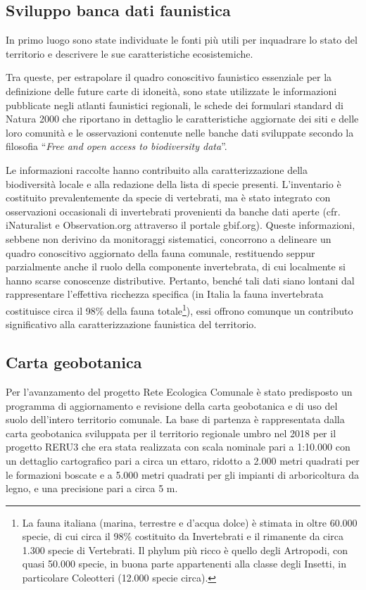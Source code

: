 \documentclass[
  a4paper,
]{book}
\begin{document}
\subsection{Sviluppo banca dati faunistica}\label{sviluppo-banca-dati-faunistica}

In primo luogo sono state individuate le fonti più utili per inquadrare lo stato del territorio e descrivere le sue caratteristiche ecosistemiche.

Tra queste, per estrapolare il quadro conoscitivo faunistico essenziale per la definizione delle future carte di idoneità, sono state utilizzate le informazioni pubblicate negli atlanti faunistici regionali, le schede dei formulari standard di Natura 2000 che riportano in dettaglio le caratteristiche aggiornate dei siti e delle loro comunità e le osservazioni contenute nelle banche dati sviluppate secondo la filosofia ``\emph{Free and open access to biodiversity data}''.

Le informazioni raccolte hanno contribuito alla caratterizzazione della biodiversità locale e alla redazione della lista di specie presenti.
L'inventario è costituito prevalentemente da specie di vertebrati, ma è stato integrato con osservazioni occasionali di invertebrati provenienti da banche dati aperte (cfr. iNaturalist e Observation.org attraverso il portale gbif.org).
Queste informazioni, sebbene non derivino da monitoraggi sistematici, concorrono a delineare un quadro conoscitivo aggiornato della fauna comunale, restituendo seppur parzialmente anche il ruolo della componente invertebrata, di cui localmente si hanno scarse conoscenze distributive.
Pertanto, benché tali dati siano lontani dal rappresentare l'effettiva ricchezza specifica (in Italia la fauna invertebrata costituisce circa il 98\% della fauna totale\footnote{La fauna italiana (marina, terrestre e d'acqua dolce) è stimata in oltre 60.000 specie, di cui circa il 98\% costituito da Invertebrati e il rimanente da circa 1.300 specie di Vertebrati.
  Il phylum più ricco è quello degli Artropodi, con quasi 50.000 specie, in buona parte appartenenti alla classe degli Insetti, in particolare Coleotteri (12.000 specie circa).}), essi offrono comunque un contributo significativo alla caratterizzazione faunistica del territorio.

\subsection{Carta geobotanica}\label{carta-geobotanica}

Per l'avanzamento del progetto Rete Ecologica Comunale è stato predisposto un programma di aggiornamento e revisione della carta geobotanica e di uso del suolo dell'intero territorio comunale.
La base di partenza è rappresentata dalla carta geobotanica sviluppata per il territorio regionale umbro nel 2018 per il progetto RERU3 che era stata realizzata con scala nominale pari a 1:10.000 con un dettaglio cartografico pari a circa un ettaro, ridotto a 2.000 metri quadrati per le formazioni boscate e a 5.000 metri quadrati per gli impianti di arboricoltura da legno, e una precisione pari a circa 5 m.
\end{document}
